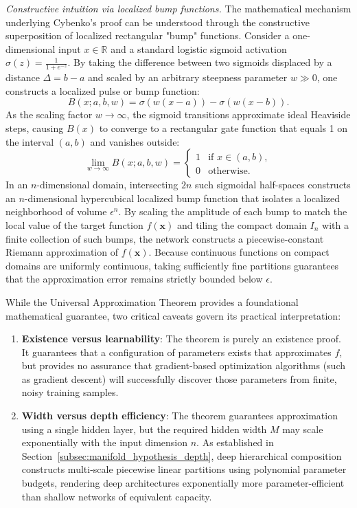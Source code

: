 \documentclass[../../main.tex]{subfiles}
\begin{document}
\textit{Constructive intuition via localized bump functions.} The mathematical mechanism underlying Cybenko's proof can be understood through the constructive superposition of localized rectangular "bump" functions. Consider a one-dimensional input $x \in \mathbb{R}$ and a standard logistic sigmoid activation $\sigma(z) = \frac{1}{1 + e^{-z}}$. By taking the difference between two sigmoids displaced by a distance $\Delta = b - a$ and scaled by an arbitrary steepness parameter $w \gg 0$, one constructs a localized pulse or bump function:
\begin{equation}
B(x; a, b, w) = \sigma(w(x - a)) - \sigma(w(x - b)).
\end{equation}
As the scaling factor $w \to \infty$, the sigmoid transitions approximate ideal Heaviside steps, causing $B(x)$ to converge to a rectangular gate function that equals 1 on the interval $(a, b)$ and vanishes outside:
\begin{equation}
\lim_{w \to \infty} B(x; a, b, w) = \begin{cases} 
1 & \text{if } x \in (a, b), \\ 
0 & \text{otherwise}. 
\end{cases}
\end{equation}
In an $n$-dimensional domain, intersecting $2n$ such sigmoidal half-spaces constructs an $n$-dimensional hypercubical localized bump function that isolates a localized neighborhood of volume $\epsilon^n$. By scaling the amplitude of each bump to match the local value of the target function $f(\mathbf{x})$ and tiling the compact domain $I_n$ with a finite collection of such bumps, the network constructs a piecewise-constant Riemann approximation of $f(\mathbf{x})$. Because continuous functions on compact domains are uniformly continuous, taking sufficiently fine partitions guarantees that the approximation error remains strictly bounded below $\epsilon$.

While the Universal Approximation Theorem provides a foundational mathematical guarantee, two critical caveats govern its practical interpretation:
\begin{enumerate}[label=(\roman*)]
    \item \textbf{Existence versus learnability}: The theorem is purely an existence proof. It guarantees that a configuration of parameters exists that approximates $f$, but provides no assurance that gradient-based optimization algorithms (such as gradient descent) will successfully discover those parameters from finite, noisy training samples.
    \item \textbf{Width versus depth efficiency}: The theorem guarantees approximation using a single hidden layer, but the required hidden width $M$ may scale exponentially with the input dimension $n$. As established in Section~\ref{subsec:manifold_hypothesis_depth}, deep hierarchical composition constructs multi-scale piecewise linear partitions using polynomial parameter budgets, rendering deep architectures exponentially more parameter-efficient than shallow networks of equivalent capacity.
\end{enumerate}
\end{document}
